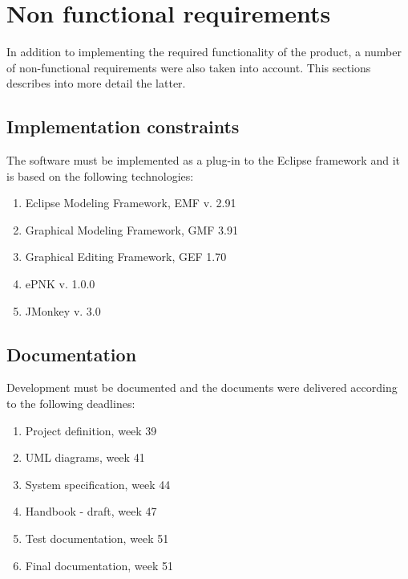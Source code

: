 \section{Non functional requirements}
\label{sec:non-functional}

In addition to implementing the required functionality of the product, a number of non-functional requirements were also taken into account. This sections describes into more detail the latter.

\subsection{Implementation constraints}
The software must be implemented as a plug-in to the Eclipse framework and it is based on the following technologies:
\begin{enumerate}
	\item Eclipse Modeling Framework, EMF v. 2.91
	\item Graphical Modeling Framework, GMF 3.91
	\item Graphical Editing Framework, GEF 1.70
	\item ePNK v. 1.0.0
	\item JMonkey v. 3.0
\end{enumerate}

\subsection{Documentation}
Development must be documented and the documents were delivered according to the following deadlines:
\begin{enumerate}
	\item Project definition, week 39
	\item UML diagrams, week 41
	\item System specification, week 44
	\item Handbook - draft, week 47
	\item Test documentation, week 51
	\item Final documentation, week 51
\end{enumerate}

